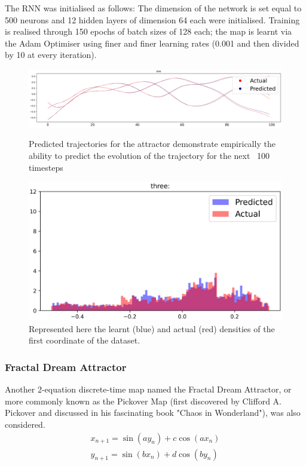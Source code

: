 \documentclass[a4paper,12pt,twoside]{report}
\begin{document}
The RNN was initialised as follows: The dimension of the network is set equal to 500 neurons and 12 hidden layers of dimension 64 each were initialised. Training is realised through 150 epochs of batch sizes of 128 each; the map is learnt via the Adam Optimiser using finer and finer learning rates (0.001 and then divided by 10 at every iteration).

\begin{figure}[ht]
  \centering
  \includegraphics[scale=0.35]{Thomas_1.eps}\caption*{Predicted trajectories for the attractor demonstrate empirically the ability to predict the evolution of the trajectory for the next ~100 timesteps}
  \includegraphics[scale=0.5]{Thomas_3.eps}\caption*{Represented here the learnt (blue) and actual (red) densities of the first coordinate of the dataset.}
\end{figure}


\subsubsection{Fractal Dream Attractor}

Another 2-equation discrete-time map named the Fractal Dream Attractor, or more commonly known as the Pickover Map (first discovered by Clifford A. Pickover and discussed in his fascinating book "Chaos in Wonderland"\cite{PickoverChaos}), was also considered.
\begin{eqnarray}\label{eqns_clifford}
  {x_{n+1}=\sin(ay_n) + c\cos(ax_n)} \\
  {y_{n+1}=\sin(bx_n)+d\cos(by_n)}
\end{eqnarray}
\end{document}
